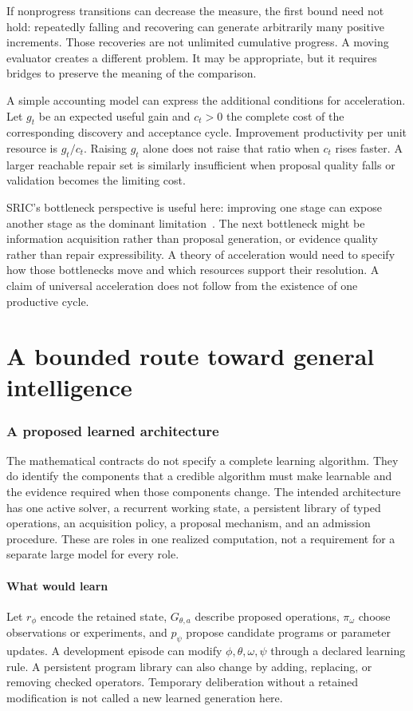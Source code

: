 \documentclass[11pt,letterpaper]{article}
\theoremstyle{plain}
\theoremstyle{definition}
\begin{document}
If nonprogress transitions can decrease the measure, the first bound need not hold: repeatedly falling and recovering can generate arbitrarily many positive increments. Those recoveries are not unlimited cumulative progress. A moving evaluator creates a different problem. It may be appropriate, but it requires bridges to preserve the meaning of the comparison.

A simple accounting model can express the additional conditions for acceleration. Let $g_t$ be an expected useful gain and $c_t>0$ the complete cost of the corresponding discovery and acceptance cycle. Improvement productivity per unit resource is $g_t/c_t$. Raising $g_t$ alone does not raise that ratio when $c_t$ rises faster. A larger reachable repair set is similarly insufficient when proposal quality falls or validation becomes the limiting cost.

SRIC's bottleneck perspective is useful here: improving one stage can expose another stage as the dominant limitation~\cite{sric}. The next bottleneck might be information acquisition rather than proposal generation, or evidence quality rather than repair expressibility. A theory of acceleration would need to specify how those bottlenecks move and which resources support their resolution. A claim of universal acceleration does not follow from the existence of one productive cycle.


\clearpage\part{A bounded route toward general intelligence}
\section{A proposed learned architecture}\label{sec:architecture}
The mathematical contracts do not specify a complete learning algorithm. They do identify the components that a credible algorithm must make learnable and the evidence required when those components change. The intended architecture has one active solver, a recurrent working state, a persistent library of typed operations, an acquisition policy, a proposal mechanism, and an admission procedure. These are roles in one realized computation, not a requirement for a separate large model for every role.

\subsection{What would learn}
Let $r_\phi$ encode the retained state, $G_{\theta,a}$ describe proposed operations, $\pi_\omega$ choose observations or experiments, and $p_\psi$ propose candidate programs or parameter updates. A development episode can modify $\phi,\theta,\omega,\psi$ through a declared learning rule. A persistent program library can also change by adding, replacing, or removing checked operators. Temporary deliberation without a retained modification is not called a new learned generation here.
\end{document}

